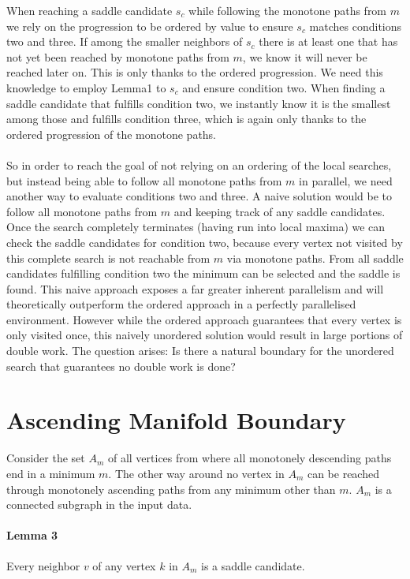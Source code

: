 \documentclass[%
	paper=A4,					%
	twoside=true,				%
	openright,					%
	parskip=full,				%
	chapterprefix=true,			%
	11pt,						%
	headings=normal,			%
	bibliography=totoc,			%
	listof=totoc,				%
	titlepage=on,				%
	captions=tableabove,		%
	draft=false,				%
]{scrreprt}%
\begin{document}
When reaching a saddle candidate \(s_c\) while following the monotone paths from \(m\) we rely on the progression to be ordered by value to ensure \(s_c\) matches conditions two and three. If among the smaller neighbors of \(s_c\) there is at least one that has not yet been reached by monotone paths from \(m\), we know it will never be reached later on. This is only thanks to the ordered progression. We need this knowledge to employ Lemma1 to \(s_c\) and ensure condition two. When finding a saddle candidate that fulfills condition two, we instantly know it is the smallest among those and fulfills condition three, which is again only thanks to the ordered progression of the monotone paths.

\paragraph{}
So in order to reach the goal of not relying on an ordering of the local searches, but instead being able to follow all monotone paths from \(m\) in parallel, we need another way to evaluate conditions two and three. A naive solution would be to follow all monotone paths from \(m\) and keeping track of any saddle candidates. Once the search completely terminates (having run into local maxima) we can check the saddle candidates for condition two, because every vertex not visited by this complete search is not reachable from \(m\) via monotone paths. From all saddle candidates fulfilling condition two the minimum can be selected and the saddle is found. This naive approach exposes a far greater inherent parallelism and will theoretically outperform the ordered approach in a perfectly parallelised environment. However while the ordered approach guarantees that every vertex is only visited once, this naively unordered solution would result in large portions of double work. The question arises: Is there a natural boundary for the unordered search that guarantees no double work is done?

\section{Ascending Manifold Boundary} \label{ssec:num1}
Consider the set \(A_m\) of all vertices from where all monotonely descending paths end in a minimum \(m\). The other way around no vertex in \(A_m\) can be reached through monotonely ascending paths from any minimum other than \(m\). \(A_m\) is a connected subgraph in the input data. 

\paragraph{Lemma 3} Every neighbor \(v\) of any vertex \(k\) in \(A_m\) is a saddle candidate.
\end{document}
